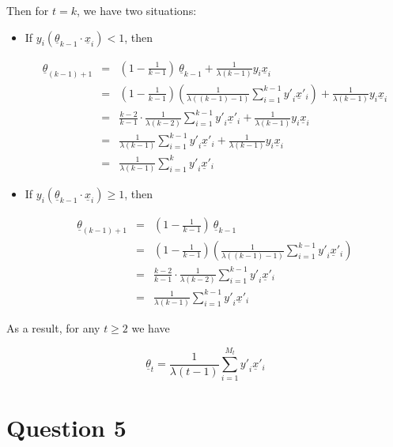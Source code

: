 \documentclass[12pt]{article}
\begin{document}
Then for $t = k$, we have two situations:

\begin{itemize}
\item If $y_i(\underline {\theta}_{k-1} \cdot \underline {x}_i) < 1$, then

\begin{eqnarray*}
\underline {\theta}_{(k-1)+1} & = & (1 - \frac {1}{k-1}) \: \underline
{\theta}_{k-1} + \frac {1}{\lambda (k-1)} y_i \underline {x}_i \\
& = & (1 - \frac {1}{k-1}) (\frac {1}{\lambda ((k-1)-1)}
\sum_{i=1}^{k-1} {{y'}_i \underline {x}'_i}) 
 + \frac {1}{\lambda (k-1)} y_i \underline {x}_i \\
& = & \frac {k-2}{k-1} \cdot \frac {1}{\lambda (k-2)} \sum_{i=1}^{k-1}
{{y'}_i \underline {x}'_i} + \frac {1}{\lambda 
  (k-1)} y_i \underline {x}_i \\
& = & \frac {1}{\lambda (k-1)} \sum_{i=1}^{k-1} {{y'}_i \underline
  {x}'_i} + \frac {1}{\lambda (k-1)} y_i \underline {x}_i \\
& = & \frac {1}{\lambda (k-1)} \sum_{i=1}^{k} {{y'}_i \underline
  {x}'_i}
\end{eqnarray*}

\item If $y_i(\underline {\theta}_{k-1} \cdot \underline {x}_i) \ge
  1$, then

\begin{eqnarray*}
\underline {\theta}_{(k-1)+1} & = & (1 - \frac {1}{k-1}) \: \underline
{\theta}_{k-1} \\
& = & (1 - \frac {1}{k-1}) (\frac {1}{\lambda ((k-1)-1)}
\sum_{i=1}^{k-1} {{y'}_i \underline {x}'_i}) \\
& = & \frac {k-2}{k-1} \cdot \frac {1}{\lambda (k-2)}
\sum_{i=1}^{k-1} {{y'}_i \underline {x}'_i} \\
& = & \frac {1}{\lambda (k-1)} \sum_{i=1}^{k-1} {{y'}_i \underline
  {x}'_i}
\end{eqnarray*}
\end{itemize}

As a result, for any $t \ge 2$ we have

\begin{equation*}
  \underline {\theta}_{t} = \frac {1}{\lambda (t-1)} \sum_{i=1}^{M_t}
  {{y'}_i \underline {x}'_i}
\end{equation*}

\section*{Question 5}
\end{document}
